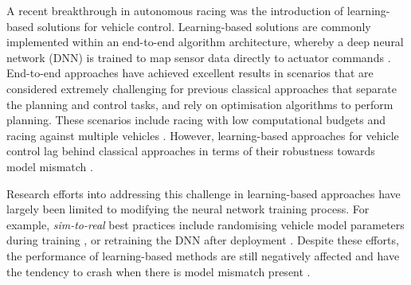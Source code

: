 
A recent breakthrough in autonomous racing was the introduction of learning-based solutions for vehicle control.
Learning-based solutions are commonly implemented within an end-to-end algorithm architecture, whereby a deep neural network (DNN) is trained to map sensor data directly to actuator commands \cite{Betz2021}.
End-to-end approaches have achieved excellent results in scenarios that are considered extremely challenging for previous classical approaches that separate the planning and control tasks, and rely on optimisation algorithms to perform planning.
These scenarios include racing with low computational budgets \cite{Evans2021a, Tatulea-Codrean2020} and racing against multiple vehicles \cite{Song2021, Wurman2022}.
However, learning-based approaches for vehicle control lag behind classical approaches in terms of their robustness towards model mismatch \cite{Chisari2021}.

Research efforts into addressing this challenge in learning-based approaches have largely been limited to modifying the neural network training process.
For example, \emph{sim-to-real} best practices include randomising vehicle model parameters during training \cite{Ivanov2020}, or retraining the DNN after deployment \cite{Zhou2020}.
Despite these efforts, the performance of learning-based methods are still negatively affected and have the tendency to crash when there is model mismatch present \cite{hsu2022}.






